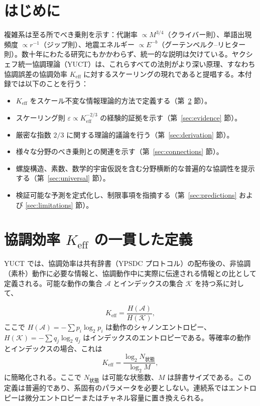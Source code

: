 \documentclass[11pt,a4paper]{article}
\newcommand{\Keff}{K_{\mathrm{eff}}}
\newcommand{\eps}{\varepsilon}
\begin{document}
	\tableofcontents
	\newpage
	
	\section{はじめに}
	複雑系は至る所でべき乗則を示す：代謝率 \(\propto M^{3/4}\)（クライバー則）、単語出現頻度 \(\propto r^{-1}\)（ジップ則）、地震エネルギー \(\propto E^{-b}\)（グーテンベルク–リヒター則）。数十年にわたる研究にもかかわらず、統一的な説明は欠けている。ヤクシェフ統一協調理論（YUCT）は、これらすべての法則がより深い原理、すなわち協調誤差の協調効率 \(\Keff\) に対するスケーリングの現れであると提唱する。本付録では以下のことを行う：
	\begin{itemize}
		\item \(\Keff\) をスケール不変な情報理論的方法で定義する（第~\ref{sec:keff} 節）。
		\item スケーリング則 \(\eps \propto \Keff^{-2/3}\) の経験的証拠を示す（第~\ref{sec:evidence} 節）。
		\item 厳密な指数 \(2/3\) に関する理論的議論を行う（第~\ref{sec:derivation} 節）。
		\item 様々な分野のべき乗則との関連を示す（第~\ref{sec:connections} 節）。
		\item 螺旋構造、素数、数学的宇宙仮説を含む分野横断的な普遍的な協調性を提示する（第~\ref{sec:universal} 節）。
		\item 検証可能な予測を定式化し、制限事項を指摘する（第~\ref{sec:predictions} および \ref{sec:limitations} 節）。
	\end{itemize}
	
	\section{協調効率 \(\Keff\) の一貫した定義}
	\label{sec:keff}
	
	YUCT では、協調効率は共有辞書（YPSDC プロトコル）の配布後の、非協調（素朴）動作に必要な情報と、協調動作中に実際に伝達される情報との比として定義される。可能な動作の集合 \(\mathcal{A}\) とインデックスの集合 \(\mathcal{K}\) を持つ系に対して、
	
	\begin{equation}
		\Keff = \frac{H(\mathcal{A})}{H(\mathcal{K})},
		\label{eq:keff}
	\end{equation}
	ここで \(H(\mathcal{A}) = -\sum p_i \log_2 p_i\) は動作のシャノンエントロピー、\(H(\mathcal{K}) = -\sum q_j \log_2 q_j\) はインデックスのエントロピーである。等確率の動作とインデックスの場合、これは
	\begin{equation}
		\Keff = \frac{\log_2 N_{\text{状態}}}{\log_2 M},
		\label{eq:keff-simple}
	\end{equation}
	に簡略化される。ここで \(N_{\text{状態}}\) は可能な状態数、\(M\) は辞書サイズである。この定義は普遍的であり、系固有のパラメータを必要としない。連続系ではエントロピーは微分エントロピーまたはチャネル容量に置き換えられる。
	
\end{document}
